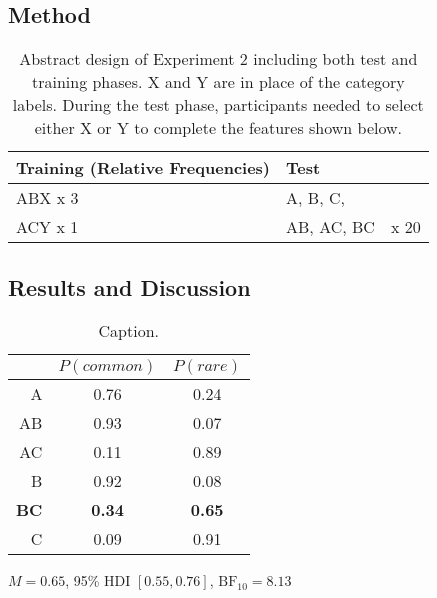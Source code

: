 \documentclass[10pt,letterpaper]{article}
\begin{document}
\subsection{Method}

\begin{table}[!ht]
  \begin{center}
    \caption{Abstract design of Experiment 2 including both test and training phases. X and Y are in place of the category labels. During the test phase, participants needed to select either X or Y to complete the features shown below.\\}
    \label{tab:abstract-exp2}
    \begin{tabular}{llr} %
      \textbf{Training (Relative Frequencies)} & \textbf{Test}& \\
      \hline
      ABX x 3 &  A, B, C,         &  \\
      ACY x 1 &  AB, AC, BC      & x 20 \\
      \hline
    \end{tabular}
  \end{center}
\end{table}

\subsection{Results and Discussion}

\begin{table}[H]
  \begin{center}
    \caption{Caption.\\}
    \label{tab:results-exp2}
    \vskip 0.12in
    \begin{tabular}{rcc}
      \hline
       & $P(common)$ & $P(rare)$ \\
      \hline
      A & 0.76 & 0.24\\
      AB & 0.93 & 0.07\\
      AC & 0.11 & 0.89\\
      B & 0.92 & 0.08\\
      \textbf{BC} & \textbf{0.34} & \textbf{0.65}\\
      C & 0.09 & 0.91\\
    \end{tabular}
  \end{center}
\end{table}

$M = 0.65$, 95\% HDI $[0.55, 0.76]$, $\mathrm{BF}_{10} = 8.13$
\end{document}
